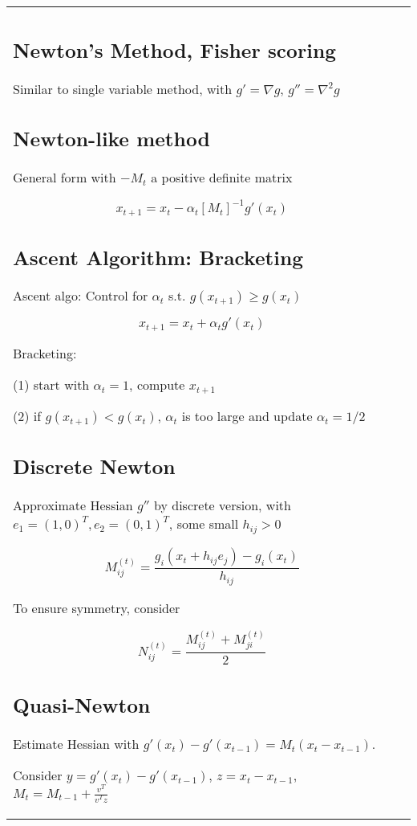 \begin{tabulary}{\textwidth}{l L}

\subsection{Newton's Method, Fisher scoring}

Similar to single variable method, with
$g'=\nabla g$, $g''=\nabla^2 g$

\subsection{Newton-like method}

General form with $-M_t$ a positive definite matrix

$$
x_{t+1} = x_t - \alpha_t [M_t]^{-1} g'(x_t)
$$

\subsection{Ascent Algorithm: Bracketing}

Ascent algo: Control for $\alpha_t$ s.t. $g(x_{t+1}) \geq g(x_t)$

$$
x_{t+1} = x_t + \alpha_t g'(x_t)
$$

Bracketing:

(1) start with $\alpha_t = 1$, compute $x_{t+1}$

(2) if $g(x_{t+1}) < g(x_t)$, $\alpha_t$ is too large and update $\alpha_t = 1/2$

\subsection{Discrete Newton}

Approximate Hessian $g''$ by discrete version, with $e_1 = (1, 0)^T, e_2 = (0, 1)^T$, some small $h_{ij} > 0$

$$
M_{ij}^{(t)} = \frac{g_i(x_t + h_{ij} e_j) - g_i(x_t)}{h_{ij}}
$$

To ensure symmetry, consider

$$
N_{ij}^{(t)} = \frac{M_{ij}^{(t)} + M_{ji}^{(t)}}{2}
$$

\subsection{Quasi-Newton}

Estimate Hessian with $g'(x_t) - g'(x_{t-1}) = M_t (x_t - x_{t-1})$.

Consider $y = g'(x_t) - g'(x_{t-1})$, $z=x_t - x_{t-1}$,
$M_t = M_{t-1} + \frac{v^T}{v^Tz}$


\end{tabulary}

